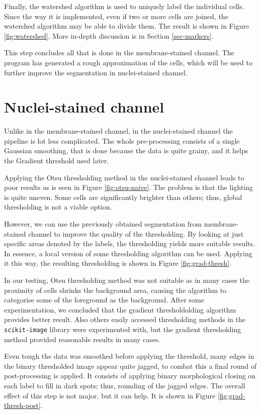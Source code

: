 \documentclass[
  digital,     %
  oneside,     %
  nosansbold,  %
  nocolorbold, %
  lof,         %
  lot,         %
]{fithesis4}
\begin{document}
Finally, the watershed algorithm is used to uniquely label the individual cells.
Since the way it is implemented, even if two or more cells are joined, the
watershed algorithm may be able to divide them. The result is shown in Figure
\ref{fig:watershed}. More in-depth discussion is in Section \ref{sec-markers}.

This step concludes all that is done in the membrane-stained channel. The
program has generated a rough approximation of the cells, which will be used to
further improve the segmentation in nuclei-stained channel.

\section{Nuclei-stained channel}
Unlike in the membrane-stained channel, in the nuclei-stained channel the
pipeline is lot less complicated. The whole pre-processing consists of a single
Gaussian smoothing, that is done because the data is quite grainy, and it helps
the Gradient threshold used later.

Applying the Otsu thresholding method in the nuclei-stained channel leads to
poor results as is seen in Figure \ref{fig:otsu-naive}. The problem is that the
lighting is quite uneven. Some cells are significantly brighter than others;
thus, global thresholding is not a viable option.

However, we can use the previously obtained segmentation from membrane-stained
channel to improve the quality of the thresholding. By looking at just specific
areas denoted by the labels, the thresholding yields more suitable results. In
essence, a local version of some thresholding algorithm can be used. Applying it
this way, the resulting thresholding is shown in Figure \ref{fig:grad-thresh}.

In our testing, Otsu thresholding method was not suitable as in many cases the
proximity of cells shrinks the background area, causing the algorithm to
categorise some of the foreground as the background. After some experimentation,
we concluded that the gradient thresholdolding algorithm provides better result.
Also others easily accessed thresholding methods in the \texttt{scikit-image}
library were experimented with, but the gradient thresholding method provided
reasonable results in many cases.


Even tough the data was smoothed before applying the threshold, many edges in
the binary thresholded image appear quite jagged, to combat this a final round
of post-processing is applied. It consists of applying binary morphological
closing on each label to fill in dark spots; thus, rounding of the jagged edges.
The overall effect of this step is not major, but it can help. It is shown in
Figure \ref{fig:grad-thresh-post}.
\end{document}
